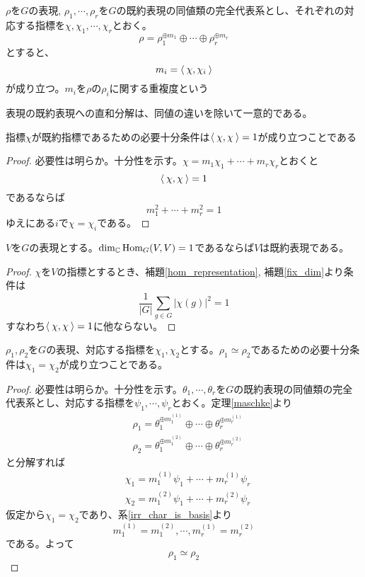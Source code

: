 \documentclass{ltjsarticle}
\begin{document}
\begin{cor}\label{multiplicity}
  $\rho$を$G$の表現, $\rho_1,\cdots,\rho_r$を$G$の既約表現の同値類の完全代表系とし、それぞれの対応する指標を$\chi,\chi_1,\cdots,\chi_r$とおく。
  \[
  \rho=\rho_1^{\oplus m_1}\oplus\cdots\oplus\rho_r^{\oplus m_r}  
  \]
  とすると、
  \[
  m_i=\langle\:\chi,\chi_i\:\rangle
  \]
  が成り立つ。$m_i$を$\rho$の$\rho_i$に関する重複度という
\end{cor}

\begin{cor}
  表現の既約表現への直和分解は、同値の違いを除いて一意的である。
\end{cor}


\begin{cor}
  指標$\chi$が既約指標であるための必要十分条件は$\langle\:\chi,\chi\:\rangle=1$が成り立つことである
\end{cor}

\begin{proof}
  必要性は明らか。十分性を示す。$\chi=m_1\chi_1+\cdots+m_r\chi_r$とおくと
  \[
  \langle\:\chi,\chi\:\rangle=1  
  \]
  であるならば
  \[
  m_1^2+\cdots+m_r^2=1  
  \]
  ゆえにある$i$で$\chi=\chi_i$である。
\end{proof}

\begin{cor}[Schurの補題の逆]\label{reverse_schur}
  $V$を$G$の表現とする。$\dim_{\mathbb{C}}\text{Hom}_G(V,V)=1$であるならば$V$は既約表現である。
\end{cor}

\begin{proof}
  $\chi$を$V$の指標とするとき、補題\ref{hom_representation}, 補題\ref{fix_dim}より条件は
  \[
  \frac{1}{|G|}\sum_{g\in G}|\chi(g)|^2=1
  \]
  すなわち$\langle\:\chi,\chi\:\rangle=1$に他ならない。
\end{proof}



\begin{cor}\label{rep_and_char}
  $\rho_1,\rho_2$を$G$の表現、対応する指標を$\chi_1,\chi_2$とする。$\rho_1\simeq \rho_2$であるための必要十分条件は$\chi_1=\chi_2$が成り立つことである。
\end{cor}

\begin{proof}
  必要性は明らか。十分性を示す。$\theta_1,\cdots, \theta_r$を$G$の既約表現の同値類の完全代表系とし、対応する指標を$\psi_1,\cdots,\psi_r$とおく。定理\ref{maschke}より
  \begin{align*}
    &\rho_1=\theta_1^{\oplus m^{(1)}_1}\oplus\cdots\oplus\theta_r^{\oplus m^{(1)}_r}\\
    &\rho_2=\theta_1^{\oplus m^{(2)}_1}\oplus\cdots\oplus\theta_r^{\oplus m^{(2)}_r}
  \end{align*}
  と分解すれば
  \begin{align*}
    &\chi_1=m^{(1)}_1\psi_1+\cdots+m^{(1)}_r\psi_r\\
    &\chi_2=m^{(2)}_1\psi_1+\cdots+m^{(2)}_r\psi_r
  \end{align*}
  仮定から$\chi_1=\chi_2$であり、系\ref{irr_char_is_basis}より
  \[
  m^{(1)}_1=m^{(2)}_1,\cdots,m^{(1)}_r=m^{(2)}_r
  \]
  である。よって
  \[
  \rho_1\simeq\rho_2  
  \]
\end{proof}
\end{document}
